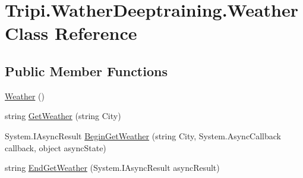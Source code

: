 \hypertarget{class_tripi_1_1_wather_deeptraining_1_1_weather}{
\section{Tripi.WatherDeeptraining.Weather Class Reference}
\label{class_tripi_1_1_wather_deeptraining_1_1_weather}
}


 
\subsection*{Public Member Functions}
\begin{DoxyCompactItemize}
\item 
\hypertarget{class_tripi_1_1_wather_deeptraining_1_1_weather_a2e38e899b41c8d2e4863b44f15c73803}{
\hyperlink{class_tripi_1_1_wather_deeptraining_1_1_weather_a2e38e899b41c8d2e4863b44f15c73803}{Weather} ()}
\label{class_tripi_1_1_wather_deeptraining_1_1_weather_a2e38e899b41c8d2e4863b44f15c73803}

\begin{DoxyCompactList}\small\item\em \item\end{DoxyCompactList}\item 
\hypertarget{class_tripi_1_1_wather_deeptraining_1_1_weather_a7e8b8dc8b2b48065c2684e127f87f803}{
string \hyperlink{class_tripi_1_1_wather_deeptraining_1_1_weather_a7e8b8dc8b2b48065c2684e127f87f803}{GetWeather} (string City)}
\label{class_tripi_1_1_wather_deeptraining_1_1_weather_a7e8b8dc8b2b48065c2684e127f87f803}

\begin{DoxyCompactList}\small\item\em \item\end{DoxyCompactList}\item 
\hypertarget{class_tripi_1_1_wather_deeptraining_1_1_weather_a4fb22d607e930c896a664fae1097478d}{
System.IAsyncResult \hyperlink{class_tripi_1_1_wather_deeptraining_1_1_weather_a4fb22d607e930c896a664fae1097478d}{BeginGetWeather} (string City, System.AsyncCallback callback, object asyncState)}
\label{class_tripi_1_1_wather_deeptraining_1_1_weather_a4fb22d607e930c896a664fae1097478d}

\begin{DoxyCompactList}\small\item\em \item\end{DoxyCompactList}\item 
\hypertarget{class_tripi_1_1_wather_deeptraining_1_1_weather_ad41ef5416b0ad7f26131ce7c827ba325}{
string \hyperlink{class_tripi_1_1_wather_deeptraining_1_1_weather_ad41ef5416b0ad7f26131ce7c827ba325}{EndGetWeather} (System.IAsyncResult asyncResult)}
\label{class_tripi_1_1_wather_deeptraining_1_1_weather_ad41ef5416b0ad7f26131ce7c827ba325}


\end{DoxyCompactItemize}

